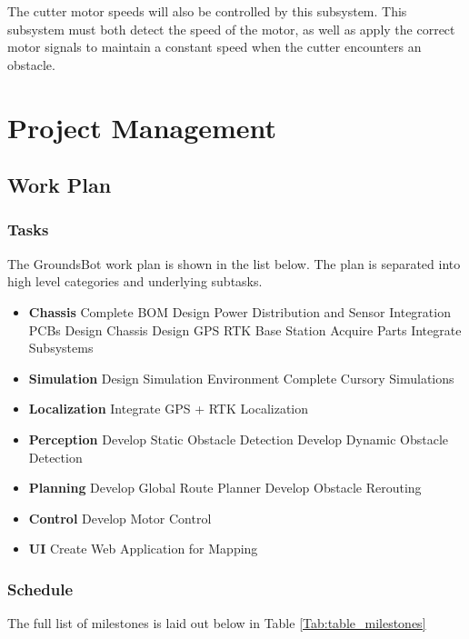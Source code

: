 \documentclass[12pt]{extarticle}
\begin{document}
			The cutter motor speeds will also be controlled by this subsystem. This subsystem must both detect the speed of the motor, as well as apply the correct motor signals to maintain a constant speed when the cutter encounters an obstacle. 


\newpage
\section{Project Management}
\subsection{Work Plan}
\subsubsection{Tasks}
The GroundsBot work plan is shown in the list below.  The plan is separated into high level categories and underlying subtasks. \\

\begin{itemize}
  \item [] \textbf{Chassis}
    \subitem Complete BOM
    \subitem Design Power Distribution and Sensor Integration PCBs %
    \subitem Design Chassis
    \subitem Design GPS RTK Base Station
    \subitem Acquire Parts
    \subitem Integrate Subsystems
  \item [] \textbf{Simulation}
    \subitem Design Simulation Environment
    \subitem Complete Cursory Simulations
  \item [] \textbf{Localization}
    \subitem Integrate GPS + RTK Localization
  \item [] \textbf{Perception}
    \subitem Develop Static Obstacle Detection
    \subitem Develop Dynamic Obstacle Detection
  \item [] \textbf{Planning}
    \subitem Develop Global Route Planner
    \subitem Develop Obstacle Rerouting
  \item [] \textbf{Control}
    \subitem Develop Motor Control
  \item [] \textbf{UI}
    \subitem Create Web Application for Mapping
\end{itemize}

   
\subsubsection{Schedule}
The full list of milestones is laid out below in Table \ref{Tab:table_milestones}\\ 
\end{document}
